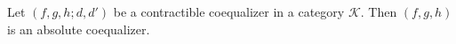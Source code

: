 Let $(f, g, h; d, d')$ be a contractible coequalizer in a category $\mathcal{K}$. Then $(f, g, h)$ is an absolute coequalizer.
